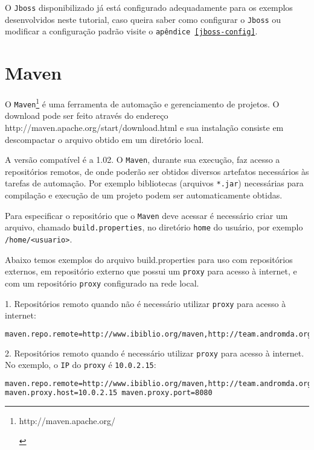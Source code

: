 O \texttt{Jboss} disponibilizado já está configurado adequadamente para os exemplos
desenvolvidos neste tutorial, caso queira saber como configurar o \texttt{Jboss} ou
modificar a configuração padrão visite o \texttt{apêndice \ref{jboss-config}}.

\section{Maven}
O
\texttt{Maven}\footnote{\hypertarget{http://maven.apache.org/}{http://maven.apache.org/}}
é uma ferramenta de automação e gerenciamento de projetos. O download pode ser
feito através do endereço
\hypertarget{http://maven.apache.org/start/download.html}{http://maven.apache.org/start/download.html}
e sua instalação consiste em descompactar o arquivo obtido em um diretório
local.

A versão compatível é a 1.02. O \texttt{Maven}, durante sua execução, faz acesso
a repositórios remotos, de onde poderão ser obtidos diversos artefatos
necessários às tarefas de automação. Por exemplo bibliotecas (arquivos
\texttt{*.jar}) necessárias para compilação e execução de um projeto podem ser
automaticamente obtidas.

Para especificar o repositório que o \texttt{Maven} deve acessar é necessário
criar um arquivo, chamado \texttt{build.properties}, no diretório \texttt{home}
do usuário, por exemplo \texttt{/home/<usuario>}.

Abaixo temos exemplos do arquivo build.properties para uso com repositórios
externos, em repositório externo que possui um \texttt{proxy} para acesso à
internet, e com um repositório \texttt{proxy} configurado na rede local.

1. Repositórios remoto quando não é necessário utilizar \texttt{proxy} para
acesso à internet:

\begin{lstlisting}[language=bash]
maven.repo.remote=http://www.ibiblio.org/maven,http://team.andromda.org/maven 
\end{lstlisting}

2. Repositórios remoto quando é necessário utilizar \texttt{proxy} para acesso à
internet. No exemplo, o \texttt{IP} do \texttt{proxy} é \texttt{10.0.2.15}:

\begin{lstlisting}[language=bash]
maven.repo.remote=http://www.ibiblio.org/maven,http://team.andromda.org/maven
maven.proxy.host=10.0.2.15 maven.proxy.port=8080 
\end{lstlisting}


